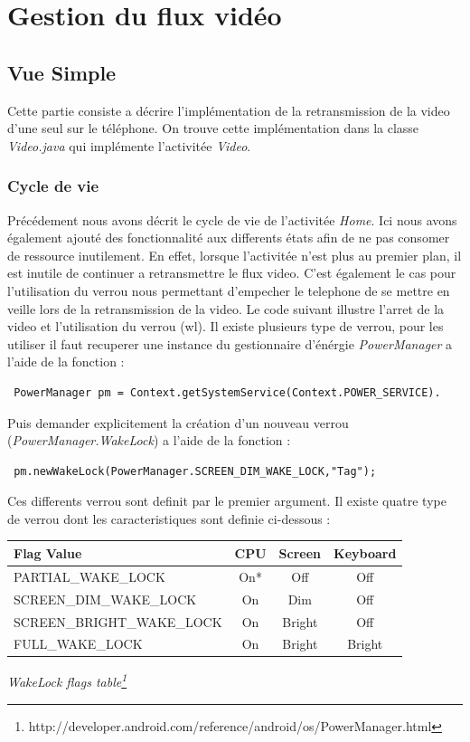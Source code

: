 \section{Gestion du flux vidéo}
\subsection{Vue Simple}
Cette partie consiste a décrire l'implémentation de la retransmission de la
video d'une seul sur le téléphone. On trouve cette implémentation dans la classe
\textit{Video.java} qui implémente l'activitée \textit{Video}.
\subsubsection{Cycle de vie}
Précédement nous avons décrit le cycle de vie de l'activitée \textit{Home}.
Ici nous avons également ajouté des fonctionnalité aux differents états afin de
ne pas consomer de ressource inutilement. En effet, lorsque l'activitée n'est
plus au premier plan, il est inutile de continuer a retransmettre le flux
video.\newline
C'est également le cas pour l'utilisation du verrou nous permettant d'empecher
le telephone de se mettre en veille lors de la retransmission de la video. Le
code suivant illustre l'arret de la video et l'utilisation du verrou
(wl).\newline
Il existe plusieurs type de verrou, pour les utiliser il faut recuperer une
instance du gestionnaire d'énérgie \textit{PowerManager} a l'aide de la
fonction : 
\begin{lstlisting}
 PowerManager pm = Context.getSystemService(Context.POWER_SERVICE).
\end{lstlisting}
Puis demander explicitement la création d'un nouveau verrou
(\textit{PowerManager.WakeLock}) a l'aide de la fonction :
\begin{lstlisting}
 pm.newWakeLock(PowerManager.SCREEN_DIM_WAKE_LOCK,"Tag");
\end{lstlisting}
Ces differents verrou sont definit par le premier argument. Il existe quatre
type de verrou dont les caracteristiques sont definie ci-dessous :\newline
\begin{center}
\begin{tabular}{|l|c|c|c|}
\hline
Flag Value & CPU & Screen & Keyboard \\
\hline
PARTIAL\_WAKE\_LOCK & On* & Off & Off \\
SCREEN\_DIM\_WAKE\_LOCK & On & Dim & Off \\ 
SCREEN\_BRIGHT\_WAKE\_LOCK & On & Bright & Off \\
FULL\_WAKE\_LOCK & On & Bright & Bright \\
\hline
\end{tabular}
\newline
\textit{WakeLock flags table\footnote{\label{wakeLockTable}
http://developer.android.com/reference/android/os/PowerManager.html}}
\newline
\end{center}
